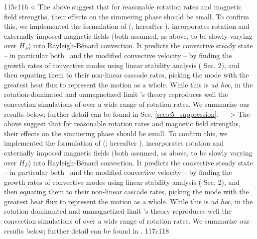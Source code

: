 115c116
< The above suggest that for reasonable rotation rates and magnetic field strengths, their effects on the simmering phase should be small.  To confirm this, we implemented the formulation of \citeauthor{stev79} (\citeyear{stev79}; hereafter \citeal{stev79}).  \citeal{stev79} incorporates rotation and externally imposed magnetic fields (both assumed, as above, to be slowly varying over $H_P$) into Rayleigh-B\'{e}nard convection.  It predicts the convective steady state -- in particular both \deltanab\ and the modified convective velocity -- by finding the growth rates of convective modes using linear stability analysis (\citeal{stev79} Sec. 2), and then equating them to their non-linear cascade rates, picking the mode with the greatest heat flux to represent the motion as a whole.  While this is \textit{ad hoc}, in the rotation-dominated and unmagnetized limit \citeal{stev79}'s theory reproduces well the convection simulations of \cite{barkdl14} over a wide range of rotation rates.  We summarize our results below; further detail can be found in Sec. \ref{sec:c5_suppression}.
---
> The above suggest that for reasonable rotation rates and magnetic field strengths, their effects on the simmering phase should be small.  To confirm this, we implemented the formulation of \citeauthor{stev79} (\citeyear{stev79}; hereafter \citeal{stev79}).  \citeal{stev79} incorporates rotation and externally imposed magnetic fields (both assumed, as above, to be slowly varying over $H_P$) into Rayleigh-B\'{e}nard convection.  It predicts the convective steady state -- in particular both \deltanab\ and the modified convective velocity -- by finding the growth rates of convective modes using linear stability analysis (\citeal{stev79} Sec. 2), and then equating them to their non-linear cascade rates, picking the mode with the greatest heat flux to represent the motion as a whole.  While this is \textit{ad hoc}, in the rotation-dominanted and unmagnetized limit \citeal{stev79}'s theory reproduces well the convection simulations of \cite{barkdl14} over a wide range of rotation rates.  We summarize our results below; further detail can be found in \cite{zhu16thesis}.
117c118
